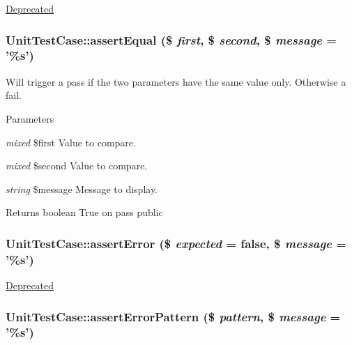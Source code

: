 \label{class_unit_test_case_a457392b00e8cfb893e519e8bc4fa1749}
\begin{Desc}
\item[\hyperlink{deprecated__deprecated000017}{Deprecated}]\end{Desc}
\hypertarget{class_unit_test_case_a93868351d598a6b80388eeb446c9daaf}{
\subsubsection[{assertEqual}]{\setlength{\rightskip}{0pt plus 5cm}UnitTestCase::assertEqual (\$ {\em first}, \/  \$ {\em second}, \/  \$ {\em message} = {\ttfamily '\%s'})}}
\label{class_unit_test_case_a93868351d598a6b80388eeb446c9daaf}
Will trigger a pass if the two parameters have the same value only. Otherwise a fail. 
\begin{DoxyParams}{Parameters}
\item[{\em mixed}]\$first Value to compare. \item[{\em mixed}]\$second Value to compare. \item[{\em string}]\$message Message to display. \end{DoxyParams}
\begin{DoxyReturn}{Returns}
boolean True on pass  public 
\end{DoxyReturn}
\hypertarget{class_unit_test_case_afca81e1dd754acc0d6a812e48faeb763}{
\subsubsection[{assertError}]{\setlength{\rightskip}{0pt plus 5cm}UnitTestCase::assertError (\$ {\em expected} = {\ttfamily false}, \/  \$ {\em message} = {\ttfamily '\%s'})}}
\label{class_unit_test_case_afca81e1dd754acc0d6a812e48faeb763}
\begin{Desc}
\item[\hyperlink{deprecated__deprecated000022}{Deprecated}]\end{Desc}
\hypertarget{class_unit_test_case_a145f3c7e61fd66e2e2d4a6bb87f58ea0}{
\subsubsection[{assertErrorPattern}]{\setlength{\rightskip}{0pt plus 5cm}UnitTestCase::assertErrorPattern (\$ {\em pattern}, \/  \$ {\em message} = {\ttfamily '\%s'})}}
